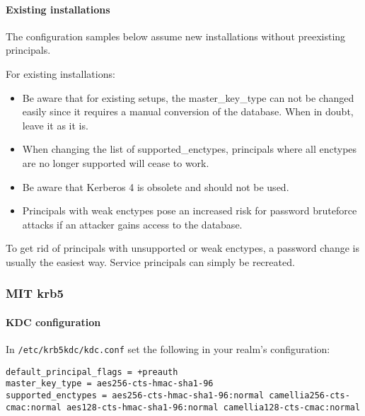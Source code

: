 \paragraph{Existing installations}

The configuration samples below assume new installations without preexisting principals.

For existing installations:
\begin{itemize}
	\item Be aware that for existing setups, the master\_key\_type can not be changed easily since it requires a manual conversion of the database. When in doubt, leave it as it is. 
	\item When changing the list of supported\_enctypes, principals where all enctypes are no longer supported will cease to work.
	\item Be aware that Kerberos 4 is obsolete and should not be used.
	\item Principals with weak enctypes pose an increased risk for password bruteforce attacks if an attacker gains access to the database.
\end{itemize}

To get rid of principals with unsupported or weak enctypes, a password change is usually the easiest way. Service principals can simply be recreated. 

\subsubsection{MIT krb5}

\paragraph{KDC configuration}
In \verb#/etc/krb5kdc/kdc.conf# set the following in your realm's configuration:
\begin{lstlisting}[breaklines]
default_principal_flags = +preauth
master_key_type = aes256-cts-hmac-sha1-96
supported_enctypes = aes256-cts-hmac-sha1-96:normal camellia256-cts-cmac:normal aes128-cts-hmac-sha1-96:normal camellia128-cts-cmac:normal
\end{lstlisting}

